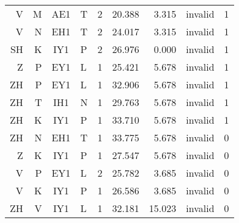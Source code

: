 \begin{longtable}{r@{ }r@{ }c@{ }l@{ } rrrrr}
 V &  M & AE1 & T  &  2 & 20.388 &  3.315 & invalid &  1 \\
 V &  N & EH1 & T  &  2 & 24.017 &  3.315 & invalid &  1 \\
SH &  K & IY1 & P  &  2 & 26.976 &  0.000 & invalid &  1 \\
 Z &  P & EY1 & L  &  1 & 25.421 &  5.678 & invalid &  1 \\
ZH &  P & EY1 & L  &  1 & 32.906 &  5.678 & invalid &  1 \\
ZH &  T & IH1 & N  &  1 & 29.763 &  5.678 & invalid &  1 \\
ZH &  K & IY1 & P  &  1 & 33.710 &  5.678 & invalid &  1 \\
ZH &  N & EH1 & T  &  1 & 33.775 &  5.678 & invalid &  0 \\
 Z &  K & IY1 & P  &  1 & 27.547 &  5.678 & invalid &  0 \\
 V &  P & EY1 & L  &  2 & 25.782 &  3.685 & invalid &  0 \\
 V &  K & IY1 & P  &  1 & 26.586 &  3.685 & invalid &  0 \\
ZH &  V & IY1 & L  &  1 & 32.181 & 15.023 & invalid &  0 \\
\bottomrule
\end{longtable}
